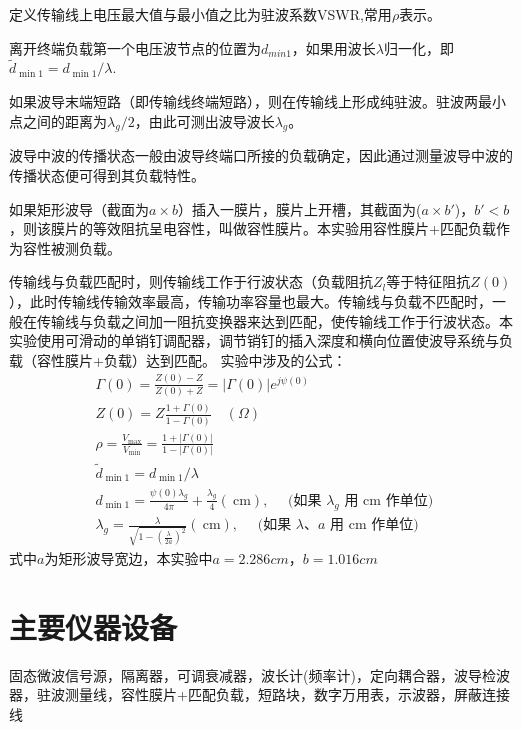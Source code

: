 \documentclass{../source/zjureport}
\begin{document}
定义传输线上电压最大值与最小值之比为驻波系数VSWR,常用$\rho$表示。

离开终端负载第一个电压波节点的位置为$d_{min1}$，如果用波长$\lambda$归一化，即$\tilde{d}_{\min 1}=d_{\min 1} / \lambda$.

如果波导末端短路（即传输线终端短路），则在传输线上形成纯驻波。驻波两最小点之间的距离为$\lambda_g/2$，由此可测出波导波长$\lambda_g$。

波导中波的传播状态一般由波导终端口所接的负载确定，因此通过测量波导中波的传播状态便可得到其负载特性。

如果矩形波导（截面为$a\times b$）插入一膜片，膜片上开槽，其截面为($a\times b'$)，$b'< b$，则该膜片的等效阻抗呈电容性，叫做容性膜片。本实验用容性膜片+匹配负载作为容性被测负载。

传输线与负载匹配时，则传输线工作于行波状态（负载阻抗$Z_l$等于特征阻抗$Z(0)$），此时传输线传输效率最高，传输功率容量也最大。传输线与负载不匹配时，一般在传输线与负载之间加一阻抗变换器来达到匹配，使传输线工作于行波状态。本实验使用可滑动的单销钉调配器，调节销钉的插入深度和横向位置使波导系统与负载（容性膜片+负载）达到匹配。
实验中涉及的公式：
$$
\begin{aligned}
&\Gamma(0)=\displaystyle \frac{Z(0)-Z}{Z(0)+Z}=|\Gamma(0)| e^{j \psi(0)} \\
&Z(0)=Z \displaystyle \frac{1+\Gamma(0)}{1-\Gamma(0)} \quad(\Omega) \\
&\rho=\displaystyle \frac{V_{\max }}{V_{\min }}=\displaystyle \frac{1+|\Gamma(0)|}{1-|\Gamma(0)|} \\
&\tilde{d}_{\min 1}=d_{\min 1} / \lambda \\
&d_{\min 1}=\displaystyle \frac{\psi(0) \lambda_{g}}{4 \pi}+\displaystyle \frac{\lambda_{g}}{4}(\mathrm{~cm}), \quad \text { (如果 } \lambda_{g} \text { 用 } \mathrm{cm} \text { 作单位) } \\
&\lambda_{g}=\displaystyle \frac{\lambda}{\sqrt{1-\left(\displaystyle \frac{\lambda}{2 a}\right)^{2}}}(\mathrm{~cm}), \quad \text { (如果 } \lambda 、 a \text { 用 } \mathrm{cm} \text { 作单位) }
\end{aligned}
$$
式中$a$为矩形波导宽边，本实验中$a =2.286 cm，b=1.016cm$

    \section{主要仪器设备}
    固态微波信号源，隔离器，可调衰减器，波长计(频率计)，定向耦合器，波导检波器，驻波测量线，容性膜片+匹配负载，短路块，数字万用表，示波器，屏蔽连接线
\end{document}
